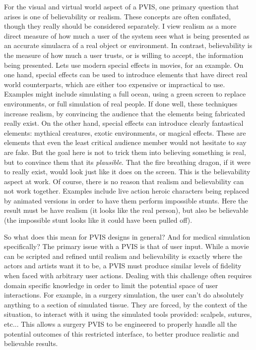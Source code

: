 \documentclass[12pt,oneside,letterpaper]{memoir}
\begin{document}
For the visual and virtual world aspect of a PVIS, one primary
question that arises is one of  believability or realism. These
concepts are often conflated, though they really should be considered
separately. I view realism as a more direct measure of how much a user
of the system sees what is being presented as an accurate simulacra of
a real object or environment. In contrast, believability is the
measure of how much a user trusts, or is willing to accept, the
information being presented. Lets use modern special effects in
movies, for an example. On one hand, special effects can be used to
introduce elements that have direct real world counterparts, which 
are either too expensive or impractical to use. Examples might include
simulating a full ocean, using a green screen to replace environments,
or full simulation of real people. If done well, these techniques
increase realism, by convincing the audience that the elements being
fabricated really exist. On the other hand, special effects can
introduce clearly fantastical elements: mythical creatures, exotic
environments, or magical effects. These are elements that even the
least critical audience member would not hesitate to say are fake. But
the goal here is not to trick them into believing something is real,
but to convince them that its \textit{plausible}. That the fire breathing
dragon, if it were to really exist, would look just like it does on
the screen. This is the believability aspect at work. Of course, there
is no reason that realism and believability can not work
together. Examples include live action heroic characters being
replaced by animated versions in order to have them perform impossible
stunts. Here the result must be have realism (it looks like the real
person), but also be believable (the impossible stunt looks like it
could have been pulled off).

So what does this mean for PVIS designs in general? And for medical
simulation specifically? The primary issue with a PVIS is that of user
input. While a movie can be scripted and refined until realism and
believability is exactly where the actors and artists want it to be, a
PVIS must produce similar levels of fidelity when faced with arbitrary
user actions. Dealing with this challenge often requires domain
specific knowledge in order to limit the potential space of user
interactions. For example, in a surgery simulation, the user can't do
absolutely anything to a section of simulated tissue. They are forced,
by the context of the situation, to interact with it using the
simulated tools provided: scalpels, sutures, etc... This allows a
surgery PVIS to be engineered to properly handle all the potential
outcomes of this restricted interface, to better produce realistic and
believable results.
\end{document}
